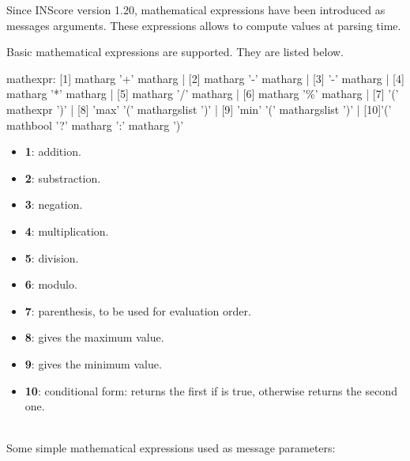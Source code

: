 

\newcommand{\inscoremathversion}{1.20}
\newcommand{\mathstring}[1]		{\textit{string}(\OSC{#1})}
\newcommand{\mathstrnum}[1]		{\textit{length}(\OSC{#1})}
\newcommand{\mathsize}[1]		{\textit{size}(\OSC{#1})}
\newcommand{\op}				{$op$}
\newcommand{\todo}	[1]			{{\big [\texttt{\textbf{#1}}]}}

\label{mathExpr}

Since INScore version \inscoremathversion , mathematical expressions have been introduced as messages arguments. These expressions allows to compute values at parsing time.


Basic mathematical expressions are supported. They are listed below.
\begin{rail}
mathexpr:     [1] matharg '+' matharg
			| [2] matharg '-' matharg
			| [3] '-' matharg
			| [4] matharg '*' matharg
			| [5] matharg '/' matharg
			| [6] matharg '\%' matharg
			| [7] '(' mathexpr ')'
			| [8] 'max' '(' mathargslist ')'
			| [9] 'min' '(' mathargslist ')'
			| [10]'(' mathbool '?' matharg ':' matharg ')'
\end{rail}

\begin{itemize}
\item \textbf{1}: addition.
\item \textbf{2}: substraction.
\item \textbf{3}: negation.
\item \textbf{4}: multiplication.
\item \textbf{5}: division.
\item \textbf{6}: modulo.
\item \textbf{7}: parenthesis, to be used for evaluation order.
\item \textbf{8}: gives the maximum value.
\item \textbf{9}: gives the minimum value.
\item \textbf{10}: conditional form: returns the first  if  is true, otherwise returns the second one.
\end{itemize}

\example\\
Some simple mathematical expressions used as message parameters:

